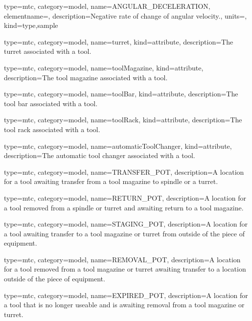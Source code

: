 {
  type=mtc,
  category=model,
  name={ANGULAR\_DECELERATION},
  elementname=,
  description={Negative rate of change of angular velocity.},
  units=,
  kind={type,sample}
}

{
  type=mtc,
  category=model,
  name={turret},
  kind={attribute},
  description={The turret associated with a tool.}
}

{
  type=mtc,
  category=model,
  name={toolMagazine},
  kind={attribute},
  description={The tool magazine associated with a tool.}
}


{
  type=mtc,
  category=model,
  name={toolBar},
  kind={attribute},
  description={The tool bar associated with a tool.}
}

{
  type=mtc,
  category=model,
  name={toolRack},
  kind={attribute},
  description={The tool rack associated with a tool.}
}

{
  type=mtc,
  category=model,
  name={automaticToolChanger},
  kind={attribute},
  description={The automatic tool changer associated with a tool.}
}

{
  type=mtc,
  category=model,
  name={TRANSFER\_POT},
  description={A location for a tool awaiting transfer from a tool magazine to spindle or a turret.}
}

{
  type=mtc,
  category=model,
  name={RETURN\_POT},
  description={A location for a tool removed from a \gls{spindle} or turret and awaiting return to a tool magazine.}
}

{
  type=mtc,
  category=model,
  name={STAGING\_POT},
  description={A location for a tool awaiting transfer to a tool magazine or turret from outside of the piece of equipment.}
}

{
  type=mtc,
  category=model,
  name={REMOVAL\_POT},
  description={A location for a tool removed from a tool magazine or turret awaiting transfer to a location outside of the piece of equipment.}
}

{
  type=mtc,
  category=model,
  name={EXPIRED\_POT},
  description={A location for a tool that is no longer useable and is awaiting removal from a tool magazine or turret.}
}

